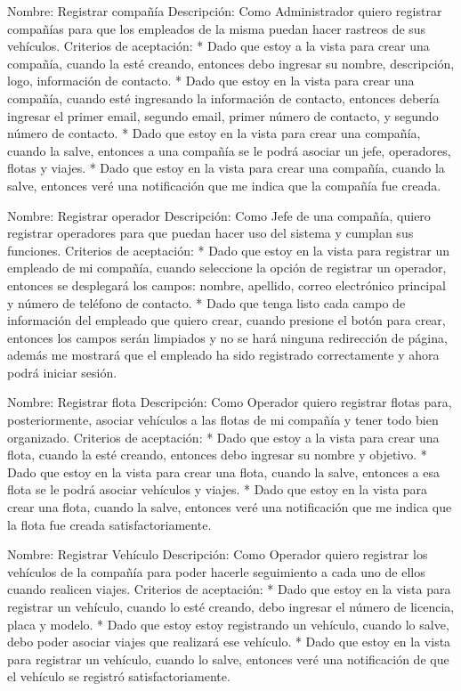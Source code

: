 \documentclass{article}
\begin{document}
Nombre: Registrar compañía
Descripción: Como Administrador quiero registrar compañías para que los empleados de la misma puedan hacer rastreos de sus vehículos.
Criterios de aceptación: 
* Dado que estoy a la vista para crear una compañía, cuando la esté creando, entonces debo ingresar su nombre, descripción, logo, información de contacto.
* Dado que estoy en la vista para crear una compañía, cuando esté ingresando la información de contacto, entonces debería ingresar el primer email, segundo email, primer número de contacto, y segundo número de contacto.
* Dado que estoy en la vista para crear una compañía, cuando la salve, entonces a una compañía se le podrá asociar un jefe, operadores, flotas y viajes.
* Dado que estoy en la vista para crear una compañía, cuando la salve, entonces veré una notificación que me indica que la compañía fue creada.

Nombre: Registrar operador
Descripción: Como Jefe de una compañía, quiero registrar operadores para que puedan hacer uso del sistema y cumplan sus funciones.
Criterios de aceptación: 
* Dado que estoy en la vista para registrar un empleado de mi compañía, cuando seleccione la opción de registrar un operador, entonces se desplegará los campos: nombre, apellido, correo electrónico principal y número de teléfono de contacto.
* Dado que tenga listo cada campo de información del empleado que quiero crear, cuando presione el botón para crear, entonces los campos serán limpiados y no se hará ninguna redirección de página, además me mostrará que el empleado ha sido registrado correctamente y ahora podrá iniciar sesión.

Nombre: Registrar flota
Descripción: Como Operador quiero registrar flotas para, posteriormente, asociar vehículos a las flotas de mi compañía y tener todo bien organizado.
Criterios de aceptación: 
* Dado que estoy a la vista para crear una flota, cuando la esté creando, entonces debo ingresar su nombre y objetivo.
* Dado que estoy en la vista para crear una flota, cuando la salve, entonces a esa flota se le podrá asociar vehículos y viajes.
* Dado que estoy en la vista para crear una flota, cuando la salve, entonces veré una notificación que me indica que la flota fue creada satisfactoriamente.

Nombre: Registrar Vehículo
Descripción: Como Operador quiero registrar los vehículos de la compañía para poder hacerle seguimiento a cada uno de ellos cuando realicen viajes.
Criterios de aceptación:
* Dado que estoy en la vista para registrar un vehículo, cuando lo esté creando, debo ingresar el número de licencia, placa y modelo.
* Dado que estoy estoy registrando un vehículo, cuando lo salve, debo poder asociar viajes que realizará ese vehículo.
* Dado que estoy en la vista para registrar un vehículo, cuando lo salve, entonces veré una notificación de que el vehículo se registró satisfactoriamente.
\end{document}
